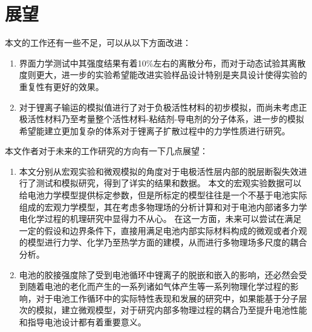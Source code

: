 \section{展望}
本文的工作还有一些不足，可以从以下方面改进：
\begin{enumerate}
	\item 界面力学测试中其强度结果有着10\%左右的离散分布，而对于动态试验其离散度则更大，进一步的实验希望能改进实验样品设计特别是夹具设计使得实验的重复性有更好的效果。
	\item 对于锂离子输运的模拟值进行了对于负极活性材料的初步模拟，而尚未考虑正极活性材料乃至考量整个活性材料-粘结剂-导电剂的分子体系，进一步的模拟希望能建立更加复杂的体系对于锂离子扩散过程中的力学性质进行研究。
\end{enumerate}
\indent 本文作者对于未来的工作研究的方向有一下几点展望：
\begin{enumerate}
	\item 本文分别从宏观实验和微观模拟的角度对于电极活性层内部的脱层断裂失效进行了测试和模拟研究，得到了详实的结果和数据。 本文的宏观实验数据可以给电池力学模型提供标定参数，但是所标定的模型往往是一个不基于电池实际组成的宏观力学模型，其在考虑多物理场的分析计算和对于电池内部诸多力学电化学过程的机理研究中显得力不从心。 在这一方面，未来可以尝试在满足一定的假设和边界条件下，直接用满足电池内部实际材料构成的微观或者介观的模型进行力学、化学乃至热学方面的建模，从而进行多物理场多尺度的耦合分析。
	\item 电池的胶接强度除了受到电池循环中锂离子的脱嵌和嵌入的影响，还必然会受到随着电池的老化而产生的一系列诸如气体产生等一系列物理化学过程的影响，对于电池工作循环中的实际特性表现和发展的研究中，如果能基于分子层次的模拟，建立微观模型，对于研究内部多物理过程的耦合乃至提升电池性能和指导电池设计都有着重要意义。
\end{enumerate}